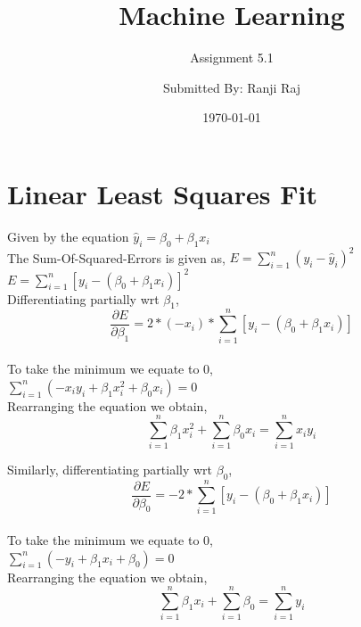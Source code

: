 \documentclass{scrartcl}
\title{Machine Learning}
\subtitle{Assignment 5.1}
\author{Submitted By: Ranji Raj}
\date{\today}
\begin{document}
\maketitle
\section*{Linear Least Squares Fit}
Given by the equation $\hat y_i=\beta_{0}+\beta_{1}x_{i}$\\

The Sum-Of-Squared-Errors is given as, $E=\sum_{i=1}^{n} (y_{i}-\hat y_{i})^{2}$\\

$E=\sum_{i=1}^{n} [y_{i}-(\beta_{0}+\beta_{1}x_{i})]^{2}$\\

Differentiating partially wrt $\beta_{1}$,\\

$$ \frac{\partial E}{\partial \beta_{1}}=2*(-x_{i})*\sum_{i=1}^{n} [y_{i}-(\beta_{0}+\beta_{1}x_{i})] $$\\

To take the minimum we equate to 0,\\

$ \sum_{i=1}^{n}(-x_{i}y_{i}+\beta_{1}x_{i}^{2}+\beta_{0}x_{i})=0$\\

Rearranging the equation we obtain,\\
\begin{equation} \label{eq:1}
\sum_{i=1}^{n}\beta_{1}x_{i}^{2}+\sum_{i=1}^{n}\beta_{0}x_{i}=\sum_{i=1}^{n}x_{i}y_{i}
\end{equation}

Similarly, differentiating partially wrt $\beta_{0}$,\\

$$ \frac{\partial E}{\partial \beta_{0}}=-2*\sum_{i=1}^{n} [y_{i}-(\beta_{0}+\beta_{1}x_{i})]$$\\

To take the minimum we equate to 0,\\

$ \sum_{i=1}^{n}(-y_{i}+\beta_{1}x_{i}+\beta_{0})=0$\\

Rearranging the equation we obtain,\\
\begin{equation} \label{eq:2}
\sum_{i=1}^{n}\beta_{1}x_{i}+\sum_{i=1}^{n}\beta_{0}=\sum_{i=1}^{n}y_{i}
\end{equation}
\end{document}
